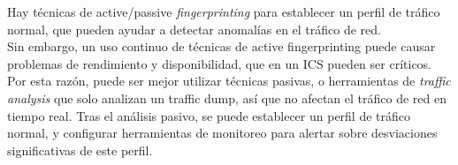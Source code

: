 Hay técnicas de active/passive \textit{fingerprinting} para establecer un perfil de tráfico normal, que pueden ayudar a detectar anomalías en el tráfico de red.\\
Sin embargo, un uso continuo de técnicas de active fingerprinting puede causar problemas de rendimiento y disponibilidad, que en un ICS pueden ser críticos.
Por esta razón, puede ser mejor utilizar técnicas pasivas, o herramientas de \textit{traffic analysis} que solo analizan un traffic dump, así que no afectan el tráfico de red en tiempo real.
Tras el análisis pasivo, se puede establecer un perfil de tráfico normal, y configurar herramientas de monitoreo para alertar sobre desviaciones significativas de este perfil.







    
